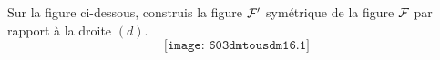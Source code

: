 Sur la figure ci-dessous, construis la figure ${\cal F}'$ symétrique de
la figure $\cal F$ par rapport à la droite $(d)$.
\[\texttt{[image: 603dmtousdm16.1]}\]